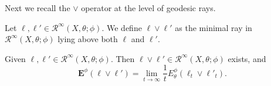 Next we recall the $\lor$ operator at the level of geodesic rays.
\begin{definition}\label{def:lorray1}
    Let $\ell,\ell'\in \mathcal{R}^{\infty}(X,\theta;\phi)$. We define $\ell\lor \ell'$ as the minimal ray in $\mathcal{R}^{\infty}(X,\theta;\phi)$ lying above both $\ell$ and $\ell'$.
\end{definition}
\begin{proposition}\label{prop:lorrays}
    Given $\ell,\ell'\in \mathcal{R}^{\infty}(X,\theta;\phi)$. Then $\ell\lor \ell'\in \mathcal{R}^{\infty}(X,\theta;\phi)$ exists, and
    \begin{equation}\label{eq:Elor}
    \mathbf{E}^{\phi}(\ell\lor \ell')=\lim_{t\to\infty}\frac{1}{t}E_{\theta}^{\phi}\left(\ell_t\lor \ell'_t\right).
    \end{equation}
\end{proposition}
